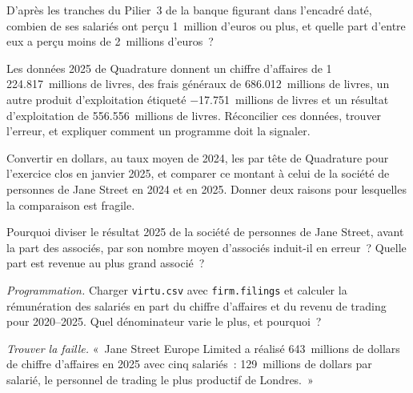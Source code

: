 \begin{exercise}[$\star$]\label{exo:in:reading-a-trading-firms-accounts:3}
D'après les tranches du Pilier~3 de la banque figurant dans l'encadré daté, combien de ses salariés ont perçu 1~million d'euros ou plus, et quelle part
d'entre eux a perçu moins de 2~millions d'euros~?
\end{exercise}

\begin{exercise}[$\star\star$]\label{exo:in:reading-a-trading-firms-accounts:4}
Les données 2025 de Quadrature donnent un chiffre d'affaires de 1\,224.817~millions de livres, des frais généraux de 686.012~millions de livres, un autre
produit d'exploitation étiqueté $-$17.751~millions de livres et un résultat d'exploitation de 556.556~millions de livres. Réconcilier ces données, trouver
l'erreur, et expliquer comment un programme doit la signaler.
\end{exercise}

\begin{exercise}[$\star\star$]\label{exo:in:reading-a-trading-firms-accounts:5}
Convertir en dollars, au taux moyen de 2024, les  par tête de Quadrature pour l'exercice clos en janvier 2025, et comparer
ce montant à celui de la société de personnes de Jane Street en 2024 et en 2025. Donner deux raisons pour lesquelles la comparaison est fragile.
\end{exercise}

\begin{exercise}[$\star\star$]\label{exo:in:reading-a-trading-firms-accounts:6}
Pourquoi diviser le résultat 2025 de la société de personnes de Jane Street, avant la part des associés, par son nombre moyen d'associés
induit-il en erreur~? Quelle part est revenue au plus grand associé~?
\end{exercise}

\begin{exercise}[$\star\star\star$]\label{exo:in:reading-a-trading-firms-accounts:7}
\emph{Programmation.} Charger \texttt{virtu.csv} avec \texttt{firm.filings} et calculer la rémunération des salariés en part du chiffre d'affaires
et du revenu de trading pour 2020--2025. Quel dénominateur varie le plus, et pourquoi~?
\end{exercise}

\begin{exercise}[$\star\star\star$]\label{exo:in:reading-a-trading-firms-accounts:8}
\emph{Trouver la faille.} «~Jane Street Europe Limited a réalisé 643~millions de dollars de chiffre d'affaires en 2025 avec cinq salariés~:
129~millions de dollars par salarié, le personnel de trading le plus productif de Londres.~»
\end{exercise}

